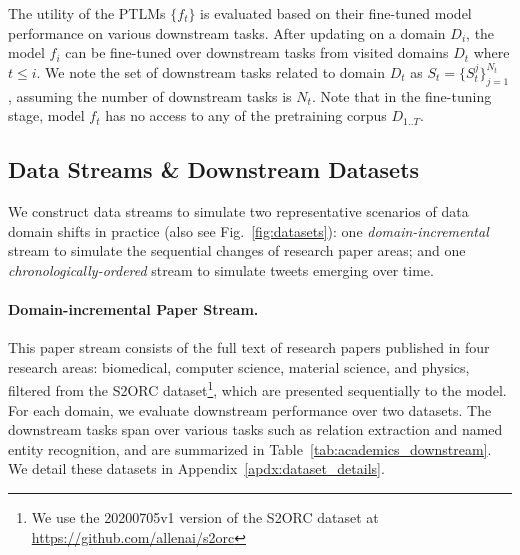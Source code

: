 The utility of the PTLMs $\{f_t\}$ is evaluated based on their fine-tuned model performance on various downstream tasks. 
After updating on a domain $D_{i}$,
the model $f_{i}$ can be fine-tuned over downstream tasks from visited domains $D_t$ where $t \leq i$. We note the set of downstream tasks related to domain $D_t$ as $S_t = \{S_t^j\}_{j=1}^{N_t}$, assuming the number of downstream tasks is $N_t$. %
Note that in the fine-tuning stage, model $f_t$ has no access to any of the pretraining corpus $D_{1..T}$. 





\vspace{-0.1cm}
\subsection{Data Streams \& Downstream Datasets}
\label{ssec:datasets}
We construct data streams to simulate two representative scenarios of data domain shifts in practice (also see Fig.~\ref{fig:datasets}): one \textit{domain-incremental} stream to simulate the sequential changes of research paper areas; and one \textit{chronologically-ordered} stream to simulate tweets emerging over time.


\paragraph{Domain-incremental Paper Stream.} This paper stream consists of the full text of research papers published in four research areas: biomedical, computer science, material science, and physics, filtered from the S2ORC dataset\footnote{\scriptsize{We use the 20200705v1 version of the S2ORC dataset at \url{https://github.com/allenai/s2orc}}}, which are presented sequentially to the model. For each domain, we evaluate downstream performance over two datasets. The downstream tasks span over various tasks such as relation extraction and named entity recognition, and are summarized in Table~\ref{tab:academics_downstream}. We detail these datasets in Appendix~\ref{apdx:dataset_details}. %




